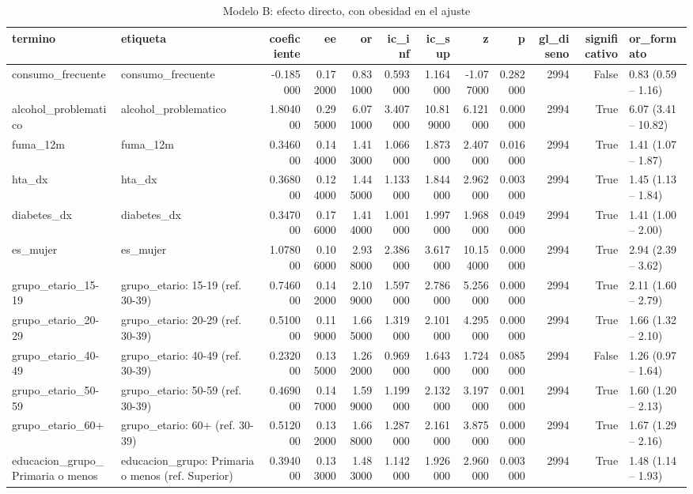 \begin{table}[htbp]
\caption{Modelo B: efecto directo, con obesidad en el ajuste}
\label{tab:tabla_45_modelo_B_efecto_directo}
\begin{tabular}{llrrrrrrrrrl}
\toprule
termino & etiqueta & coeficiente & ee & or & ic\_inf & ic\_sup & z & p & gl\_diseno & significativo & or\_formato \\
\midrule
consumo\_frecuente & consumo\_frecuente & -0.185000 & 0.172000 & 0.831000 & 0.593000 & 1.164000 & -1.077000 & 0.282000 & 2994 & False & 0.83 (0.59 – 1.16) \\
alcohol\_problematico & alcohol\_problematico & 1.804000 & 0.295000 & 6.071000 & 3.407000 & 10.819000 & 6.121000 & 0.000000 & 2994 & True & 6.07 (3.41 – 10.82) \\
fuma\_12m & fuma\_12m & 0.346000 & 0.144000 & 1.413000 & 1.066000 & 1.873000 & 2.407000 & 0.016000 & 2994 & True & 1.41 (1.07 – 1.87) \\
hta\_dx & hta\_dx & 0.368000 & 0.124000 & 1.445000 & 1.133000 & 1.844000 & 2.962000 & 0.003000 & 2994 & True & 1.45 (1.13 – 1.84) \\
diabetes\_dx & diabetes\_dx & 0.347000 & 0.176000 & 1.414000 & 1.001000 & 1.997000 & 1.968000 & 0.049000 & 2994 & True & 1.41 (1.00 – 2.00) \\
es\_mujer & es\_mujer & 1.078000 & 0.106000 & 2.938000 & 2.386000 & 3.617000 & 10.154000 & 0.000000 & 2994 & True & 2.94 (2.39 – 3.62) \\
grupo\_etario\_15-19 & grupo\_etario: 15-19 (ref. 30-39) & 0.746000 & 0.142000 & 2.109000 & 1.597000 & 2.786000 & 5.256000 & 0.000000 & 2994 & True & 2.11 (1.60 – 2.79) \\
grupo\_etario\_20-29 & grupo\_etario: 20-29 (ref. 30-39) & 0.510000 & 0.119000 & 1.665000 & 1.319000 & 2.101000 & 4.295000 & 0.000000 & 2994 & True & 1.66 (1.32 – 2.10) \\
grupo\_etario\_40-49 & grupo\_etario: 40-49 (ref. 30-39) & 0.232000 & 0.135000 & 1.262000 & 0.969000 & 1.643000 & 1.724000 & 0.085000 & 2994 & False & 1.26 (0.97 – 1.64) \\
grupo\_etario\_50-59 & grupo\_etario: 50-59 (ref. 30-39) & 0.469000 & 0.147000 & 1.599000 & 1.199000 & 2.132000 & 3.197000 & 0.001000 & 2994 & True & 1.60 (1.20 – 2.13) \\
grupo\_etario\_60+ & grupo\_etario: 60+ (ref. 30-39) & 0.512000 & 0.132000 & 1.668000 & 1.287000 & 2.161000 & 3.875000 & 0.000000 & 2994 & True & 1.67 (1.29 – 2.16) \\
educacion\_grupo\_Primaria o menos & educacion\_grupo: Primaria o menos (ref. Superior) & 0.394000 & 0.133000 & 1.483000 & 1.142000 & 1.926000 & 2.960000 & 0.003000 & 2994 & True & 1.48 (1.14 – 1.93) \\

\end{tabular}
\end{table}
